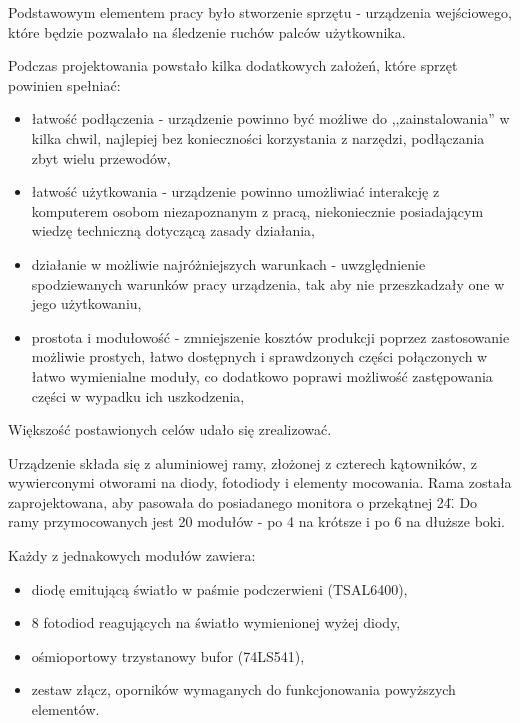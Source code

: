 \label{ch:current_state}

Podstawowym elementem pracy było stworzenie sprzętu - urządzenia wejściowego, które będzie pozwalało na śledzenie ruchów palców użytkownika.

Podczas projektowania powstało kilka dodatkowych założeń, które sprzęt powinien spełniać:
\begin{itemize}
 \item łatwość podłączenia - urządzenie powinno być możliwe do ,,zainstalowania'' w kilka chwil, najlepiej bez konieczności korzystania z narzędzi, podłączania zbyt wielu przewodów,
 \item łatwość użytkowania - urządzenie powinno umożliwiać interakcję z komputerem osobom niezapoznanym z pracą, niekoniecznie posiadającym wiedzę techniczną dotyczącą zasady działania,
 \item działanie w możliwie najróżniejszych warunkach - uwzględnienie spodziewanych warunków pracy urządzenia, tak aby nie przeszkadzały one w jego użytkowaniu,
 \item prostota i modułowość - zmniejszenie kosztów produkcji poprzez zastosowanie możliwie prostych, łatwo dostępnych i sprawdzonych części połączonych w łatwo wymienialne moduły, co dodatkowo poprawi możliwość zastępowania części w wypadku ich uszkodzenia,
\end{itemize}

Większość postawionych celów udało się zrealizować.

Urządzenie składa się z aluminiowej ramy, złożonej z czterech kątowników, z wywierconymi otworami na diody, fotodiody i elementy mocowania. Rama została zaprojektowana, aby pasowała do posiadanego monitora o przekątnej 24\". Do ramy przymocowanych jest 20 modułów - po 4 na krótsze i po 6 na dłuższe boki.

Każdy z jednakowych modułów zawiera:
\begin{itemize}
 \item diodę emitującą światło w paśmie podczerwieni (TSAL6400),
 \item 8 fotodiod reagujących na światło wymienionej wyżej diody,
 \item ośmioportowy trzystanowy bufor (74LS541),
 \item zestaw złącz, oporników wymaganych do funkcjonowania powyższych elementów.
\end{itemize}


